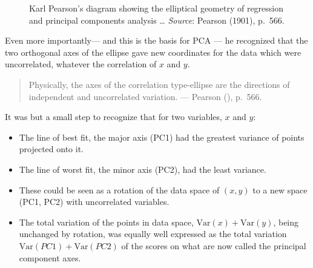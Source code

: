 \documentclass[
  letterpaper,
  10pt,
  krantz2]{krantz}
\providecommand{\tightlist}{%
  \setlength{\itemsep}{0pt}\setlength{\parskip}{0pt}}\usepackage{longtable,booktabs,array}
\begin{document}
\begin{figure}


\caption{\label{fig-Pearson1901-2}Karl Pearson's diagram showing the
elliptical geometry of regression and principal components analysis
\ldots{} \emph{Source}: Pearson (1901), p.~566.}

\end{figure}%

Even more importantly--- and this is the basis for PCA --- he recognized
that the two orthogonal axes of the ellipse gave new coordinates for the
data which were uncorrelated, whatever the correlation of \(x\) and
\(y\).

\begin{quote}
Physically, the axes of the correlation type-ellipse are the directions
of independent and uncorrelated variation. --- Pearson
(), p.~566.
\end{quote}

It was but a small step to recognize that for two variables, \(x\) and
\(y\):

\begin{itemize}
\tightlist
\item
  The line of best fit, the major axis (PC1) had the greatest variance
  of points projected onto it.
\item
  The line of worst fit, the minor axis (PC2), had the least variance.
\item
  These could be seen as a rotation of the data space of \((x, y)\) to a
  new space (PC1, PC2) with uncorrelated variables.
\item
  The total variation of the points in data space,
  \(\text{Var}(x) + \text{Var}(y)\), being unchanged by rotation, was
  equally well expressed as the total variation
  \(\text{Var}(PC1) + \text{Var}(PC2)\) of the scores on what are now
  called the principal component axes.
\end{itemize}
\end{document}
